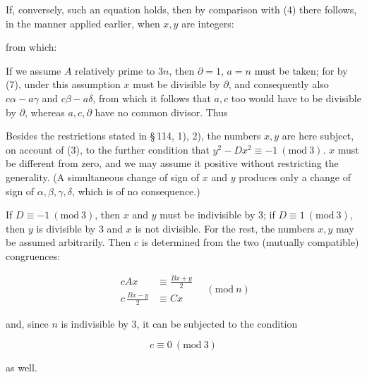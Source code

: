 
If, conversely, such an equation holds, then by comparison with (4)
there follows, in the manner applied earlier, when $x, y$ are
integers:


from which:


If we assume $A$ relatively prime to $3n$, then $\partial = 1$,
$a = n$ must be taken; for by (7), under this assumption $x$ must be
divisible by $\partial$, and consequently also $c\alpha-a\gamma$ and
$c\beta-a\delta$, from which it follows that $a, c$ too would have to
be divisible by $\partial$, whereas $a, c, \partial$ have no common
divisor. Thus


Besides the restrictions stated in \S\,114, 1), 2), the numbers
$x, y$ are here subject, on account of (3), to the further condition
that $y^2-Dx^2 \equiv -1\ (\mathrm{mod}\ 3)$.  $x$ must be different from
zero, and we may assume it positive without restricting the
generality. (A simultaneous change of sign of $x$ and $y$ produces
only a change of sign of $\alpha, \beta, \gamma, \delta$, which is of
no consequence.)

If $D \equiv -1\ (\mathrm{mod}\ 3)$, then $x$ and $y$ must be
indivisible by 3; if $D \equiv 1\ (\mathrm{mod}\ 3)$, then $y$ is
divisible by 3 and $x$ is not divisible. For the rest, the numbers
$x, y$ may be assumed arbitrarily. Then $c$ is determined from the
two (mutually compatible) congruences:

\[
\begin{aligned}
cAx &\equiv \frac{Bx+y}{2} \\[4pt]
c\,\frac{Bx-y}{2} &\equiv Cx
\end{aligned}
\quad (\mathrm{mod}\ n)
\]

and, since $n$ is indivisible by 3, it can be subjected to the
condition

\[
c \equiv 0\ (\mathrm{mod}\ 3)
\]

as well.
